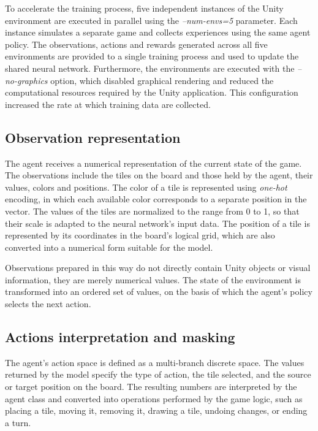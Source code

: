 To accelerate the training process, five independent instances of the Unity environment are executed in parallel using the \textit{--num-envs=5} parameter. Each instance simulates a separate game and collects experiences using the same agent policy. The observations, actions and rewards generated across all five environments are provided to a single training process and used to update the shared neural network. Furthermore, the environments are executed with the \textit{--no-graphics} option, which disabled graphical rendering and reduced the computational resources required by the Unity application. This configuration increased the rate at which training data are collected.

\subsection{Observation representation}
The agent receives a numerical representation of the current state of the game. The observations include the tiles on the board and those held by the agent, their values, colors and positions. The color of a tile is represented using \textit{one-hot} encoding, in which each available color corresponds to a separate position in the vector. The values of the tiles are normalized to the range from 0 to 1, so that their scale is adapted to the neural network’s input data. The position of a tile is represented by its coordinates in the board’s logical grid, which are also converted into a numerical form suitable for the model.

Observations prepared in this way do not directly contain Unity objects or visual information, they are merely numerical values. The state of the environment is transformed into an ordered set of values, on the basis of which the agent’s policy selects the next action.


\subsection{Actions interpretation and masking}

The agent’s action space is defined as a multi-branch discrete space. The values returned by the model specify the type of action, the tile selected, and the source or target position on the board. The resulting numbers are interpreted by the agent class and converted into operations performed by the game logic, such as placing a tile, moving it, removing it, drawing a tile, undoing changes, or ending a turn.

